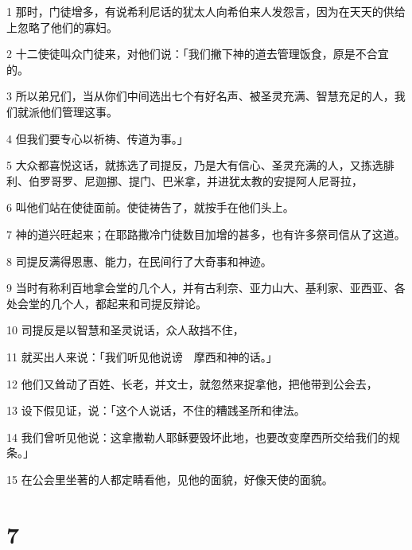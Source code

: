 \par 1 那时，门徒增多，有说希利尼话的犹太人向希伯来人发怨言，因为在天天的供给上忽略了他们的寡妇。
\par 2 十二使徒叫众门徒来，对他们说：「我们撇下神的道去管理饭食，原是不合宜的。
\par 3 所以弟兄们，当从你们中间选出七个有好名声、被圣灵充满、智慧充足的人，我们就派他们管理这事。
\par 4 但我们要专心以祈祷、传道为事。」
\par 5 大众都喜悦这话，就拣选了司提反，乃是大有信心、圣灵充满的人，又拣选腓利、伯罗哥罗、尼迦挪、提门、巴米拿，并进犹太教的安提阿人尼哥拉，
\par 6 叫他们站在使徒面前。使徒祷告了，就按手在他们头上。
\par 7 神的道兴旺起来；在耶路撒冷门徒数目加增的甚多，也有许多祭司信从了这道。
\par 8 司提反满得恩惠、能力，在民间行了大奇事和神迹。
\par 9 当时有称利百地拿会堂的几个人，并有古利奈、亚力山大、基利家、亚西亚、各处会堂的几个人，都起来和司提反辩论。
\par 10 司提反是以智慧和圣灵说话，众人敌挡不住，
\par 11 就买出人来说：「我们听见他说谤　摩西和神的话。」
\par 12 他们又耸动了百姓、长老，并文士，就忽然来捉拿他，把他带到公会去，
\par 13 设下假见证，说：「这个人说话，不住的糟践圣所和律法。
\par 14 我们曾听见他说：这拿撒勒人耶稣要毁坏此地，也要改变摩西所交给我们的规条。」
\par 15 在公会里坐著的人都定睛看他，见他的面貌，好像天使的面貌。

\chapter{7}

